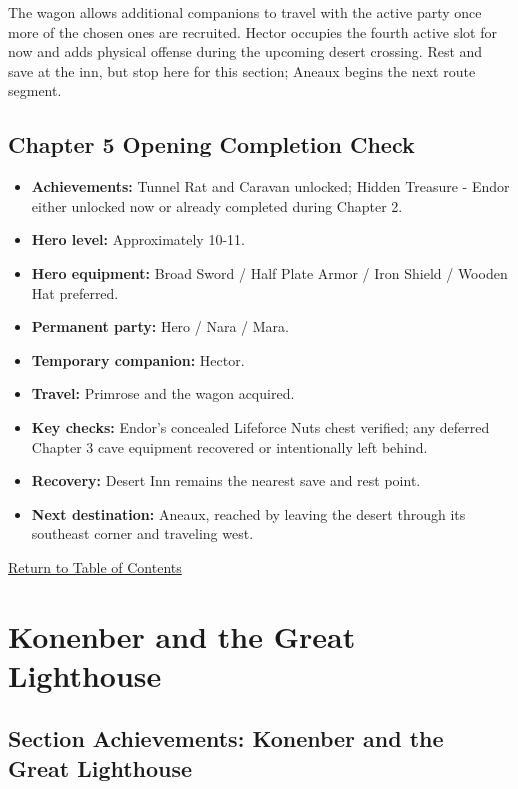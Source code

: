 \documentclass[
  american,
  10pt,
  letterpaper,
  oneside,
  open=any]{scrreprt}
\providecommand{\tightlist}{%
  \setlength{\itemsep}{0pt}\setlength{\parskip}{0pt}}
\begin{document}
The wagon allows additional companions to travel with the active party
once more of the chosen ones are recruited. Hector occupies the fourth
active slot for now and adds physical offense during the upcoming desert
crossing. Rest and save at the inn, but stop here for this section;
Aneaux begins the next route segment.

\section{Chapter 5 Opening Completion
Check}\label{chapter-5-opening-completion-check}

\begin{itemize}
\tightlist
\item
  \textbf{Achievements:} Tunnel Rat and Caravan unlocked; Hidden
  Treasure - Endor either unlocked now or already completed during
  Chapter 2.
\item
  \textbf{Hero level:} Approximately 10-11.
\item
  \textbf{Hero equipment:} Broad Sword / Half Plate Armor / Iron Shield
  / Wooden Hat preferred.
\item
  \textbf{Permanent party:} Hero / Nara / Mara.
\item
  \textbf{Temporary companion:} Hector.
\item
  \textbf{Travel:} Primrose and the wagon acquired.
\item
  \textbf{Key checks:} Endor's concealed Lifeforce Nuts chest verified;
  any deferred Chapter 3 cave equipment recovered or intentionally left
  behind.
\item
  \textbf{Recovery:} Desert Inn remains the nearest save and rest point.
\item
  \textbf{Next destination:} Aneaux, reached by leaving the desert
  through its southeast corner and traveling west.
\end{itemize}

\hyperref[table-of-contents]{Return to Table of Contents}

\chapter{Konenber and the Great
Lighthouse}\label{konenber-and-the-great-lighthouse}

\section{Section Achievements: Konenber and the Great
Lighthouse}\label{section-achievements-konenber-and-the-great-lighthouse}
\end{document}
